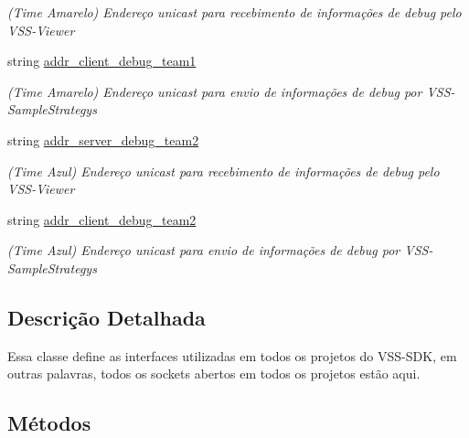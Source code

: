 \begin{DoxyCompactItemize}
\begin{DoxyCompactList}\small\item\em (Time Amarelo) Endereço unicast para recebimento de informações de debug pelo V\+S\+S-\/\+Viewer \end{DoxyCompactList}\item 
string \hyperlink{classInterface_a89e46fcba4c30138064e7dfa66520620}{addr\+\_\+client\+\_\+debug\+\_\+team1}\hypertarget{classInterface_a89e46fcba4c30138064e7dfa66520620}{}\label{classInterface_a89e46fcba4c30138064e7dfa66520620}

\begin{DoxyCompactList}\small\item\em (Time Amarelo) Endereço unicast para envio de informações de debug por V\+S\+S-\/\+Sample\+Strategys \end{DoxyCompactList}\item 
string \hyperlink{classInterface_a4c71300b21d6f2e9cbfdef12cbf01c71}{addr\+\_\+server\+\_\+debug\+\_\+team2}\hypertarget{classInterface_a4c71300b21d6f2e9cbfdef12cbf01c71}{}\label{classInterface_a4c71300b21d6f2e9cbfdef12cbf01c71}

\begin{DoxyCompactList}\small\item\em (Time Azul) Endereço unicast para recebimento de informações de debug pelo V\+S\+S-\/\+Viewer \end{DoxyCompactList}\item 
string \hyperlink{classInterface_a7c52d0df38af915072bfa3d25539dd74}{addr\+\_\+client\+\_\+debug\+\_\+team2}\hypertarget{classInterface_a7c52d0df38af915072bfa3d25539dd74}{}\label{classInterface_a7c52d0df38af915072bfa3d25539dd74}

\begin{DoxyCompactList}\small\item\em (Time Azul) Endereço unicast para envio de informações de debug por V\+S\+S-\/\+Sample\+Strategys \end{DoxyCompactList}\end{DoxyCompactItemize}


\subsection{Descrição Detalhada}
Essa classe define as interfaces utilizadas em todos os projetos do V\+S\+S-\/\+S\+DK, em outras palavras, todos os sockets abertos em todos os projetos estão aqui. 

\subsection{Métodos}
